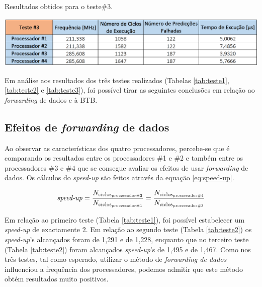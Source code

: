 \documentclass[11pt]{article}
\numberwithin{equation}{section}
\begin{document}
\begin{table}[H]
	\centering
	\caption{Resultados obtidos para o teste$\#$3.}
	\vspace{-1.5mm}
	\includegraphics[keepaspectratio=true, scale=0.40]{tabelas/teste3}
	\label{tab:teste3}
\end{table}

Em análise aos resultados dos três testes realizados (Tabelas \ref{tab:teste1}, \ref{tab:teste2} e \ref{tab:teste3}), foi possível tirar as seguintes conclusões em relação ao \textit{forwarding} de dados e à BTB.

\subsection{Efeitos de \textit{forwarding} de dados}

Ao observar as características dos quatro processadores, percebe-se que é comparando os resultados entre os processadores \#1 e \#2 e também entre os processadores \#3 e \#4 que se consegue avaliar os efeitos de usar \textit{forwarding} de dados. Os cálculos do \textit{speed-up} são feitos através da equação \ref{eq:speed-up}.

\vspace{-3mm}
\begin{equation}
\text{\textit{speed-up}} = \frac{N_{\text{ciclos\textsubscript{processador\#2}}}}{N_{\text{ciclos\textsubscript{processador\#1}}}} = \frac{N_{\text{ciclos\textsubscript{processador\#4}}}}{N_{\text{ciclos\textsubscript{processador\#3}}}}
\label{eq:speed-up}
\end{equation}

\vspace{1mm}
Em relação ao primeiro teste (Tabela \ref{tab:teste1}), foi possível estabelecer um \textit{speed-up} de exactamente 2. Em relação ao segundo teste (Tabela \ref{tab:teste2}) os \textit{speed-up}'s alcançados foram de 1,291 e de 1,228, enquanto que no terceiro teste (Tabela \ref{tab:teste2}) foram alcançados \textit{speed-up}'s de 1,495 e de 1,467. Como nos três testes, tal como esperado, utilizar o método de \textit{forwarding de dados} influenciou a frequência dos processadores, podemos admitir que este método obtém resultados muito positivos.
\end{document}
